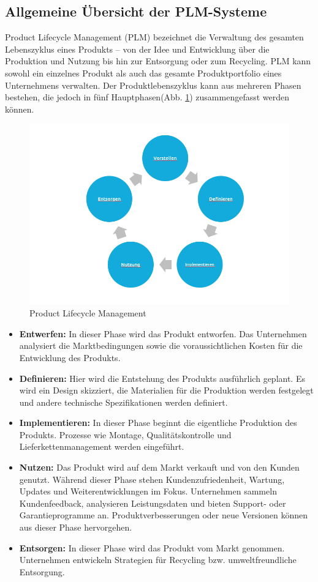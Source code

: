 \subsection{Allgemeine Übersicht der PLM-Systeme}
Product Lifecycle Management (PLM) bezeichnet die Verwaltung des gesamten Lebenszyklus eines Produkts – von der Idee und Entwicklung über die Produktion und Nutzung bis hin zur Entsorgung oder zum Recycling. PLM kann sowohl ein einzelnes Produkt als auch das gesamte Produktportfolio eines Unternehmens verwalten\cite{stark2011product}.
\newline
Der Produktlebenszyklus kann aus mehreren Phasen bestehen, die jedoch in fünf Hauptphasen(Abb. \ref{PLM}) zusammengefasst werden können.
\begin{figure}[h!]
	\begin{center}
		\includegraphics[width=12cm]{PLM.png}
		\caption{ Product Lifecycle Management\cite{stark2011product}}
		\label{PLM}
	\end{center}
\end{figure}
\begin{itemize}
	\item \textbf{Entwerfen:} In dieser Phase wird das Produkt entworfen. Das Unternehmen analysiert die Marktbedingungen sowie die voraussichtlichen Kosten für die Entwicklung des Produkts.
	\item \textbf{Definieren:} Hier wird die Entstehung des Produkts ausführlich geplant. Es wird ein Design skizziert, die Materialien für die Produktion werden festgelegt und andere technische Spezifikationen werden definiert.
	\item \textbf{Implementieren:} In dieser Phase beginnt die eigentliche Produktion des Produkts. Prozesse wie Montage, Qualitätskontrolle und Lieferkettenmanagement werden eingeführt.
	\item \textbf{Nutzen:} Das Produkt wird auf dem Markt verkauft und von den Kunden genutzt. Während dieser Phase stehen Kundenzufriedenheit, Wartung, Updates und Weiterentwicklungen im Fokus. Unternehmen sammeln Kundenfeedback, analysieren Leistungsdaten und bieten Support- oder Garantieprogramme an. Produktverbesserungen oder neue Versionen können aus dieser Phase hervorgehen.
	\item \textbf{Entsorgen:} In dieser Phase wird das Produkt vom Markt genommen. Unternehmen entwickeln Strategien für Recycling bzw. umweltfreundliche Entsorgung.
\end{itemize}

